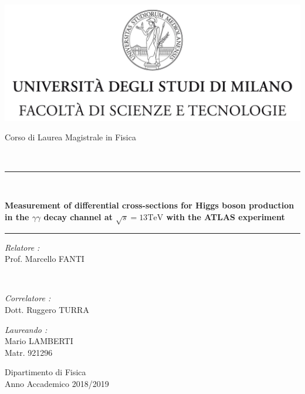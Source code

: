 \null\thispagestyle{empty}

\begin{center}
\includegraphics[scale=0.6]{immagini/marchio.jpg}
\end{center}
\vspace{0.5cm}
\begin{center}
\begin{LARGE}
Corso di Laurea Magistrale in Fisica
\end{LARGE}
\\ \vspace{0.5cm}
\rule{14cm}{0.03cm}
\\ \vspace{0.4cm}
\begin{Large}
\textbf{Measurement of differential cross-sections for Higgs boson production in the $\gamma\gamma$ decay channel at $\sqrt{s}=13\text{TeV}$ with the ATLAS experiment}
\end{Large}
\rule{14cm}{0.03cm}
\end{center}
\vspace{1cm}
\begin{flushright}
\begin{large}
\textit{Relatore :}
\vspace{0.2cm}
\\
Prof. Marcello FANTI
\end{large}
\\
\vspace{0.6cm}
\begin{large}
\textit{Correlatore :}
\vspace{0.2cm}
\\
Dott. Ruggero TURRA
\vspace{1.7cm}
\end{large}
\end{flushright}
\begin{large}
\textit{Laureando :}
\vspace{0.2cm}
\\
Mario LAMBERTI
\vspace{0.1cm}
\\
Matr. 921296
\end{large}
\begin{center}
\vfill
Dipartimento di Fisica
\\ Anno Accademico 2018/2019
\end{center}

